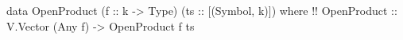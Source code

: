 \begin{code}
data OpenProduct (f  :: k -> Type)
                 (ts :: [(Symbol, k)]) where  !!
  OpenProduct :: V.Vector (Any f) -> OpenProduct f ts
\end{code}

